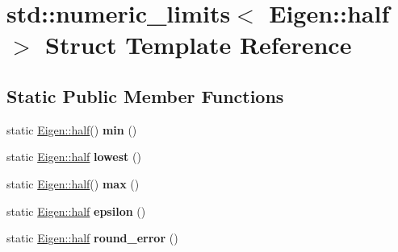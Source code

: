 \hypertarget{structstd_1_1numeric__limits_3_01_eigen_1_1half_01_4}{}\section{std\+:\+:numeric\+\_\+limits$<$ Eigen\+:\+:half $>$ Struct Template Reference}
\label{structstd_1_1numeric__limits_3_01_eigen_1_1half_01_4}
\subsection*{Static Public Member Functions}
\begin{DoxyCompactItemize}
\item 
\mbox{\label{structstd_1_1numeric__limits_3_01_eigen_1_1half_01_4_a9507756fa8961c345df7c0e99457c1ef}} 
static \hyperlink{struct_eigen_1_1half}{Eigen\+::half}() {\bfseries min} ()
\item 
\mbox{\label{structstd_1_1numeric__limits_3_01_eigen_1_1half_01_4_a285039581c5947f2b5883df785f9cb19}} 
static \hyperlink{struct_eigen_1_1half}{Eigen\+::half} {\bfseries lowest} ()
\item 
\mbox{\label{structstd_1_1numeric__limits_3_01_eigen_1_1half_01_4_a1e022053601fa76d5d832719cee22bc8}} 
static \hyperlink{struct_eigen_1_1half}{Eigen\+::half}() {\bfseries max} ()
\item 
\mbox{\label{structstd_1_1numeric__limits_3_01_eigen_1_1half_01_4_ad8d488ac2039e22b2b76d3caa5352ab4}} 
static \hyperlink{struct_eigen_1_1half}{Eigen\+::half} {\bfseries epsilon} ()
\item 
\mbox{\label{structstd_1_1numeric__limits_3_01_eigen_1_1half_01_4_ae9e00ffead499e028475ba1f1722836d}} 
static \hyperlink{struct_eigen_1_1half}{Eigen\+::half} {\bfseries round\+\_\+error} ()
\item 
\mbox{\label{structstd_1_1numeric__limits_3_01_eigen_1_1half_01_4_a64a406885de0f1d73761365cfcc11901}} 

\end{DoxyCompactItemize}

